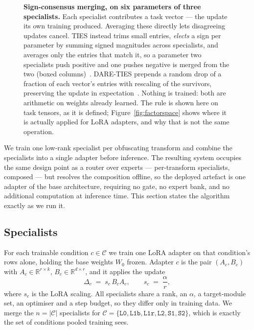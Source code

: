 \begin{figure}[t]
\caption{\textbf{Sign-consensus merging, on six parameters of three specialists.}
Each specialist contributes a task vector --- the update its own training produced. Averaging these
directly lets disagreeing updates cancel. TIES instead trims small entries, \emph{elects} a sign per
parameter by summing signed magnitudes across specialists, and averages only the entries that match
it, so a parameter two specialists push positive and one pushes negative is merged from the two
(boxed columns)~\cite{ties}. DARE-TIES prepends a random drop of a fraction of each vector's entries
with rescaling of the survivors, preserving the update in expectation~\cite{dare}. Nothing is
trained: both are arithmetic on weights already learned. The rule is shown here on task tensors, as
it is defined; Figure~\ref{fig:factorspace} shows where it is actually applied for LoRA adapters, and
why that is not the same operation.}
\label{fig:merging}
\end{figure}

We train one low-rank specialist per obfuscating transform and combine the specialists into a single
adapter before inference. The resulting system occupies the same design point as a router over
experts --- per-transform specialists, composed --- but resolves the composition offline, so the
deployed artefact is one adapter of the base architecture, requiring no gate, no expert bank, and no
additional computation at inference time. This section states the algorithm exactly as we run it.

\subsection{Specialists}
For each trainable condition $c \in \mathcal{C}$ we train one LoRA adapter on that condition's rows
alone, holding the base weights $W_0$ frozen. Adapter $c$ is the pair $(A_c, B_c)$ with
$A_c \in \mathbb{R}^{r \times k}$, $B_c \in \mathbb{R}^{d \times r}$, and it applies the update
%
\begin{equation}
\Delta_c \;=\; s_c\, B_c A_c , \qquad s_c \;=\; \frac{\alpha}{r},
\label{eq:lora}
\end{equation}
%
where $s_c$ is the LoRA scaling. All specialists share a rank, an $\alpha$, a target-module set, an
optimiser and a step budget, so they differ only in training data. We merge the $n = |\mathcal{C}|$
specialists for $\mathcal{C} = \{\texttt{L0},\texttt{L1b},\texttt{L1r},\texttt{L2},\texttt{S1},
\texttt{S2}\}$, which is exactly the set of conditions pooled training sees.

